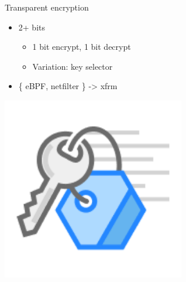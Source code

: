 \documentclass[black,white,aspectratio=169]{beamer}
\DeclareRobustCommand{\#}{\adjustbox{valign=B,totalheight=.57\baselineskip}{\oldhash}}%
\begin{document}
    \begin{frame}{Transparent encryption}
        \begin{table}
            \begin{subtable}[l]{0.7\textwidth}
        \begin{itemize}
            \item 2+ bits~\smallskip
            \begin{itemize}
                \item 1 bit encrypt, 1 bit decrypt~\smallskip
                \item Variation: key selector~\medskip
            \end{itemize}
        \item \{ eBPF, netfilter \} -> xfrm~\medskip
        \end{itemize}
            \end{subtable}
            \begin{subtable}[r]{0.2\textwidth}
                \includegraphics[width=0.6\textwidth]{encryption.png}
            \end{subtable}
        \end{table}
    \end{frame}
\end{document}
